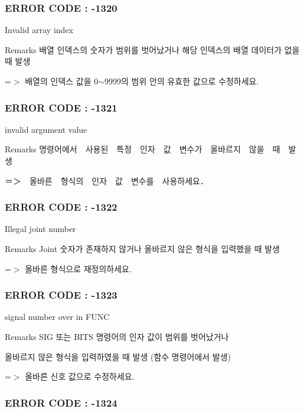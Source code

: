  \subsubsection*{E\-R\-R\-O\-R C\-O\-D\-E \-: -\/1320 }

Invalid array index \begin{DoxyRemark}{Remarks}
배열 인덱스의 숫자가 범위를 벗어났거나 해당 인덱스의 배열 데이터가 없을 때 발생 \par
 =$>$ 배열의 인덱스 값을 0$\sim$9999의 범위 안의 유효한 값으로 수정하세요.
\end{DoxyRemark}


 \subsubsection*{E\-R\-R\-O\-R C\-O\-D\-E \-: -\/1321 }

invalid argument value \begin{DoxyRemark}{Remarks}
명령어에서　사용된　특정　인자　값　변수가　올바르지　않을　때　발생 \par
 ＝＞　올바른　형식의　인자　값　변수를　사용하세요．
\end{DoxyRemark}


 \subsubsection*{E\-R\-R\-O\-R C\-O\-D\-E \-: -\/1322 }

Illegal joint number \begin{DoxyRemark}{Remarks}
Joint 숫자가 존재하지 않거나 올바르지 않은 형식을 입력했을 때 발생 \par
 =$>$ 올바른 형식으로 재정의하세요.
\end{DoxyRemark}


 \subsubsection*{E\-R\-R\-O\-R C\-O\-D\-E \-: -\/1323 }

signal number over in F\-U\-N\-C \begin{DoxyRemark}{Remarks}
S\-I\-G 또는 B\-I\-T\-S 명령어의 인자 값이 범위를 벗어났거나 \par
 올바르지 않은 형식을 입력하였을 때 발생 (함수 명령어에서 발생) \par
 =$>$ 올바른 신호 값으로 수정하세요.
\end{DoxyRemark}


 \subsubsection*{E\-R\-R\-O\-R C\-O\-D\-E \-: -\/1324 }

